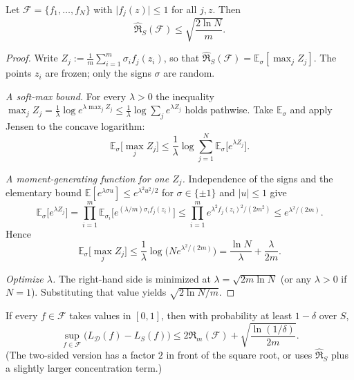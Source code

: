 \begin{lemma}[Massart]
\label{lem:mlu-massart}
Let $\mathcal{F}=\{f_1,\dots,f_N\}$ with $\lvert f_j(z)\rvert\le 1$ for all $j,z$. Then
\[
\widehat{\mathfrak{R}}_S(\mathcal{F})
\le
\sqrt{\frac{2\ln N}{m}}.
\]
\end{lemma}

\begin{proof}
Write $Z_j:=\frac1m\sum_{i=1}^m\sigma_i f_j(z_i)$, so that $\widehat{\mathfrak{R}}_S(\mathcal{F})=\mathbb{E}_\sigma[\max_j Z_j]$. The points $z_i$ are frozen; only the signs $\sigma$ are random.

\textit{A soft-max bound.}
For every $\lambda>0$ the inequality $\max_j Z_j=\frac1\lambda\log e^{\lambda\max_j Z_j}\le\frac1\lambda\log\sum_j e^{\lambda Z_j}$ holds pathwise. Take $\mathbb{E}_\sigma$ and apply Jensen to the concave logarithm:
\[
\mathbb{E}_\sigma\bigl[\max_j Z_j\bigr]
\le
\frac1\lambda\log\sum_{j=1}^N\mathbb{E}_\sigma\bigl[e^{\lambda Z_j}\bigr].
\]

\textit{A moment-generating function for one $Z_j$.}
Independence of the signs and the elementary bound $\mathbb{E}[e^{\lambda\sigma u}]\le e^{\lambda^2 u^2/2}$ for $\sigma\in\{\pm1\}$ and $\lvert u\rvert\le 1$ give
\[
\mathbb{E}_\sigma\bigl[e^{\lambda Z_j}\bigr]
=
\prod_{i=1}^m\mathbb{E}_{\sigma_i}\bigl[e^{(\lambda/m)\sigma_i f_j(z_i)}\bigr]
\le
\prod_{i=1}^m e^{\lambda^2 f_j(z_i)^2/(2m^2)}
\le
e^{\lambda^2/(2m)}.
\]
Hence
\[
\mathbb{E}_\sigma\bigl[\max_j Z_j\bigr]
\le
\frac1\lambda\log\bigl(N e^{\lambda^2/(2m)}\bigr)
=
\frac{\ln N}{\lambda}+\frac{\lambda}{2m}.
\]

\textit{Optimize $\lambda$.}
The right-hand side is minimized at $\lambda=\sqrt{2m\ln N}$ (or any $\lambda>0$ if $N=1$). Substituting that value yields $\sqrt{2\ln N/m}$.
\end{proof}

\begin{theorem}
\label{thm:mlu-rad-bound}
If every $f\in\mathcal{F}$ takes values in $[0,1]$, then with probability at least $1-\delta$ over $S$,
\[
\sup_{f\in\mathcal{F}}\bigl(L_{\mathcal{D}}(f)-L_S(f)\bigr)
\le
2\mathfrak{R}_m(\mathcal{F})
+
\sqrt{\frac{\ln(1/\delta)}{2m}}.
\]
(The two-sided version has a factor $2$ in front of the square root, or uses $\widehat{\mathfrak{R}}_S$ plus a slightly larger concentration term.)
\end{theorem}

